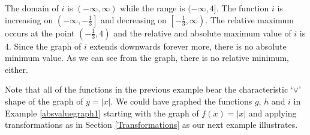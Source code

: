 {\begin{enumerate}


The domain of $i$ is $(-\infty, \infty)$ while the range is $(-\infty, 4]$. The function $i$ is increasing on $\left(-\infty, -\frac{1}{3}\right]$ and decreasing on $\left[ -\frac{1}{3}, \infty\right)$.  The relative maximum occurs at the point $\left(-\frac{1}{3}, 4\right)$ and the relative and absolute maximum value of $i$ is $4$.  Since the graph of $i$ extends downwards forever more, there is no absolute minimum value.  As we can see from the graph, there is no relative minimum, either. 

\end{enumerate}
}

Note that all of the functions in the previous example bear the characteristic `$\vee$' shape of the graph of $y=|x|$.  We could have graphed the functions $g$, $h$ and $i$ in Example \ref{absvaluegraph1} starting with the graph of $f(x)=|x|$ and applying transformations as in Section \ref{Transformations} as our next example illustrates.

\pagebreak


